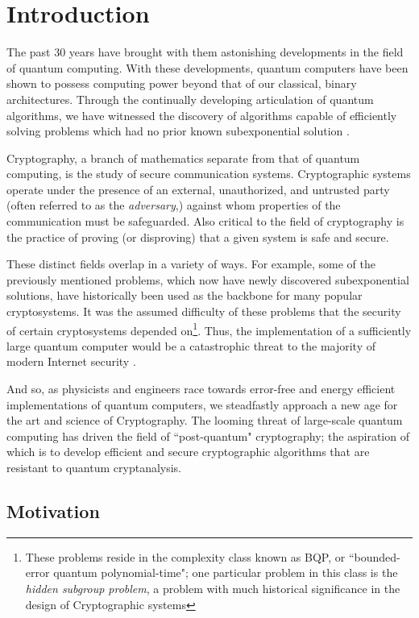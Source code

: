 \chapter{Introduction}

The past 30 years have brought with them astonishing developments in the field of quantum computing. With these developments, quantum computers have been shown to possess computing power beyond that of our classical, binary architectures. Through the continually developing articulation of quantum algorithms, we have witnessed the discovery of algorithms capable of efficiently solving problems which had no prior known subexponential solution \cite{introqc}. 

Cryptography, a branch of mathematics separate from that of quantum computing, is the study of secure communication systems. Cryptographic systems operate under the presence of an external, unauthorized, and untrusted party (often referred to as the \textit{adversary},) against whom properties of the communication must be safeguarded. Also critical to the field of cryptography is the practice of proving (or disproving) that a given system is safe and secure.

These distinct fields overlap in a variety of ways. For example, some of the previously mentioned problems, which now have newly discovered subexponential solutions, have historically been used as the backbone for many popular cryptosystems. It was the assumed difficulty of these problems that the security of certain cryptosystems depended on\footnote{These problems reside in the complexity class known as BQP, or ``bounded-error quantum polynomial-time"; one particular problem in this class is the \textit{hidden subgroup problem}, a problem with much historical significance in the design of Cryptographic systems}. Thus, the implementation of a sufficiently large quantum computer would be a catastrophic threat to the majority of modern Internet security \cite{shor}.

And so, as physicists and engineers race towards error-free and energy efficient implementations of quantum computers, we steadfastly approach a new age for the art and science of Cryptography. The looming threat of large-scale quantum computing has driven the field of ``post-quantum" cryptography; the aspiration of which is to develop efficient and secure cryptographic algorithms that are resistant to quantum cryptanalysis.\\

\section{Motivation}
\label{sec:motivation}

